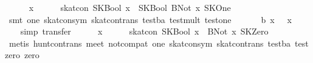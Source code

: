 \begin{isabellebody}
\ \ \ \ \isamarkupfalse%
\ x\isanewline
\ \ \ \ \isamarkupfalse%
\ {}skat{}con\ {}SKBool\ x\ {}{}{}\ SKBool\ {}BNot\ x{}{}\ SKOne{}\isanewline
\ \ \ \ \ \ \isamarkupfalse%
\ {}smt\ one\ skat{}con{}sym\ skat{}con{}trans\ test{}ba\ test{}mult\ test{}one{}\isanewline
\ \ \isamarkupfalse%
\isanewline
\ \ \isamarkupfalse%
\ b{}\ {}x\ {}\ {}\ x\ {}\ {}{}\isanewline
\ \ \isamarkupfalse%
\ {}simp{}\ transfer{}\isanewline
\ \ \ \ \isamarkupfalse%
\ x\isanewline
\ \ \ \ \isamarkupfalse%
\ {}skat{}con\ {}SKBool\ {}x\ {}{}{}\ BNot\ x{}{}\ SKZero{}\isanewline
\ \ \ \ \ \ \isamarkupfalse%
\ {}metis\ hunt{}con{}trans\ meet\ not{}compat\ one\ skat{}con{}sym\ skat{}con{}trans\ test{}ba\ test{}zero\ zero{}\isanewline
\ \ \ \ \isamarkupfalse%

\end{isabellebody}
